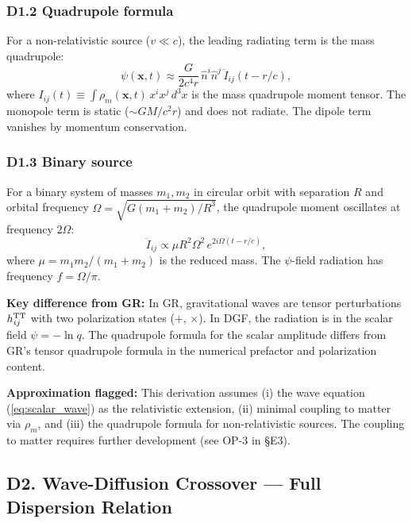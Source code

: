 \documentclass[reprint]{revtex4-2}
\begin{document}
\subsubsection{D1.2 Quadrupole formula}

For a non-relativistic source ($v \ll c$), the leading radiating term is the mass quadrupole:
\begin{equation}
\boxed{\psi(\mathbf{x},t) \approx \frac{G}{2c^4 r}\,\hat{n}^i\hat{n}^j\,\ddot{I}_{ij}(t - r/c)},
\label{eq:quadrupole}
\end{equation}
where $I_{ij}(t) \equiv \int \rho_m(\mathbf{x},t)\,x^i x^j\,d^3x$ is the mass quadrupole moment tensor. The monopole term is static ($\sim GM/c^2 r$) and does not radiate. The dipole term vanishes by momentum conservation.

\subsubsection{D1.3 Binary source}

For a binary system of masses $m_1, m_2$ in circular orbit with separation $R$ and orbital frequency $\Omega = \sqrt{G(m_1+m_2)/R^3}$, the quadrupole moment oscillates at frequency $2\Omega$:
\begin{equation}
\ddot{I}_{ij} \propto \mu R^2\Omega^2\,e^{2i\Omega(t - r/c)},
\end{equation}
where $\mu = m_1 m_2/(m_1+m_2)$ is the reduced mass. The $\psi$-field radiation has frequency $f = \Omega/\pi$.

\textbf{Key difference from GR:} In GR, gravitational waves are tensor perturbations $h_{ij}^{\rm TT}$ with two polarization states ($+$, $\times$). In DGF, the radiation is in the scalar field $\psi = -\ln q$. The quadrupole formula for the scalar amplitude differs from GR's tensor quadrupole formula in the numerical prefactor and polarization content.

\textbf{Approximation flagged:} This derivation assumes (i) the wave equation (\ref{eq:scalar_wave}) as the relativistic extension, (ii) minimal coupling to matter via $\rho_m$, and (iii) the quadrupole formula for non-relativistic sources. The coupling to matter requires further development (see OP-3 in \S E3).

\subsection{D2. Wave-Diffusion Crossover --- Full Dispersion Relation}
\end{document}
